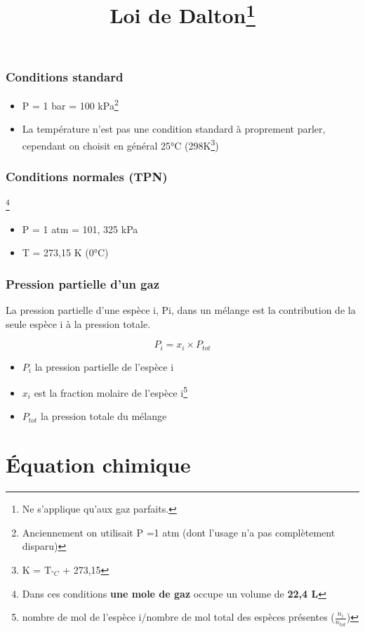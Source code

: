 \documentclass[10pt,a4paper]{book}
\begin{document}
\subsubsection{Conditions standard} \label{condStands}
\begin{itemize}
\item P = 1 bar = 100 kPa\footnote{Anciennement on utilisait P =1 atm (dont l’usage n’a pas complètement disparu)}
\item La température n'est pas une condition standard à proprement parler, cependant on choisit en général 25°C (298K\footnote{K = T$_{ °C}$ + 273,15})
\end{itemize}

\subsubsection{Conditions normales (TPN)}\footnote{Dans ces conditions \textbf{une mole de gaz} occupe un volume de \textbf{22,4 L}}

\begin{itemize}
\item P = 1 atm = 101, 325 kPa
\item T = 273,15 K (0°C)
\end{itemize}

\subsubsection{Pression partielle d'un gaz}

La pression partielle d’une espèce i, Pi, dans un mélange est la contribution de la seule
espèce i à la pression totale.
\begin{center}
\title{Loi de Dalton\footnote{Ne s'applique qu'aux gaz parfaits.}}
\end{center}
\begin{displaymath}
P_i = x_i \times P_{tot}
\end{displaymath}

\begin{itemize}
\item $P_i$ la pression partielle de l'espèce i
\item $x_i$ est la fraction molaire de l’espèce i\footnote{nombre de mol de l’espèce i/nombre de mol total des espèces présentes ($\frac{n_i}{n_{tot}}$)}
\item $P_{tot}$ la pression totale du mélange
\end{itemize}
\newpage

\section{Équation chimique} 
\end{document}

